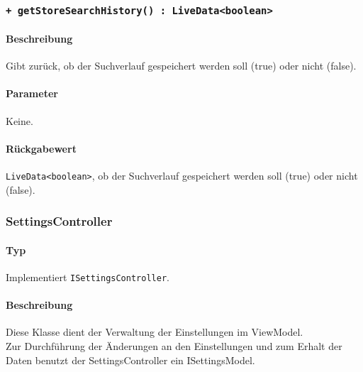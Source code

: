 \subsubsection*{\texttt{+ getStoreSearchHistory() : LiveData<boolean>}}\label{App_Settings_ISettingsController_getStoreSearchhistory}%
\paragraph*{Beschreibung}
Gibt zurück, ob der Suchverlauf gespeichert werden soll (true) oder nicht (false).
\paragraph*{Parameter}
Keine.
\paragraph*{Rückgabewert}
\texttt{LiveData<boolean>}, ob der Suchverlauf gespeichert werden soll (true) oder nicht (false).

\subsubsection{SettingsController}\label{App_Settings_SettingsController}
\paragraph*{Typ}
Implementiert \texttt{ISettingsController}.
\paragraph*{Beschreibung}
Diese Klasse dient der Verwaltung der Einstellungen im ViewModel. \\
Zur Durchführung der Änderungen an den Einstellungen und zum Erhalt der Daten benutzt der SettingsController ein ISettingsModel.
